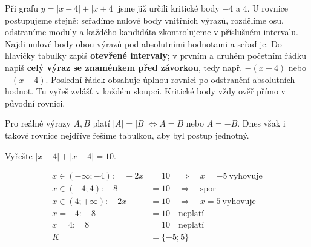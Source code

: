 \documentclass[11pt,a4paper]{article}
\begin{document}
Při grafu $y=|x-4|+|x+4|$ jsme již určili kritické body $-4$ a $4$. U rovnice postupujeme stejně: seřadíme nulové body vnitřních výrazů, rozdělíme osu, odstraníme moduly a každého kandidáta zkontrolujeme v příslušném intervalu.
Najdi nulové body obou výrazů pod absolutními hodnotami a seřaď je. Do hlavičky tabulky zapiš \textbf{otevřené intervaly}; v prvním a druhém početním řádku napiš \textbf{celý výraz se znaménkem před závorkou}, tedy např. $-(x-4)$ nebo $+(x-4)$. Poslední řádek obsahuje úplnou rovnici po odstranění absolutních hodnot. Tu vyřeš zvlášť v každém sloupci. Kritické body vždy ověř přímo v původní rovnici.
\begin{definiceBox}[title={Věta - Rovnost absolutních hodnot}]
Pro reálné výrazy $A,B$ platí $|A|=|B|\iff A=B$ nebo $A=-B$. Dnes však i takové rovnice nejdříve řešíme tabulkou, aby byl postup jednotný.
\end{definiceBox}
\begin{prikladReseniBox}[title={Příklad 1}]
Vyřešte $|x-4|+|x+4|=10$.
\tcblower
\begin{center}
\begingroup\footnotesize
\renewcommand{\arraystretch}{1.32}
\endgroup
\end{center}
\[\begin{aligned}x\in (-\infty;-4):\quad - 2 x &= 10\quad\Longrightarrow\quad x=-5\ \text{vyhovuje}\\[2pt]
x\in (-4;4):\quad 8 &= 10\quad\Longrightarrow\quad \text{spor}\\[2pt]
x\in (4;+\infty):\quad 2 x &= 10\quad\Longrightarrow\quad x=5\ \text{vyhovuje}\\[2pt]
x=-4:\quad 8 &= 10\quad\text{neplatí}\\[2pt]
x=4:\quad 8 &= 10\quad\text{neplatí}\\[2pt]
K&=\{-5;5\}\end{aligned}\]
\end{prikladReseniBox}
\end{document}
